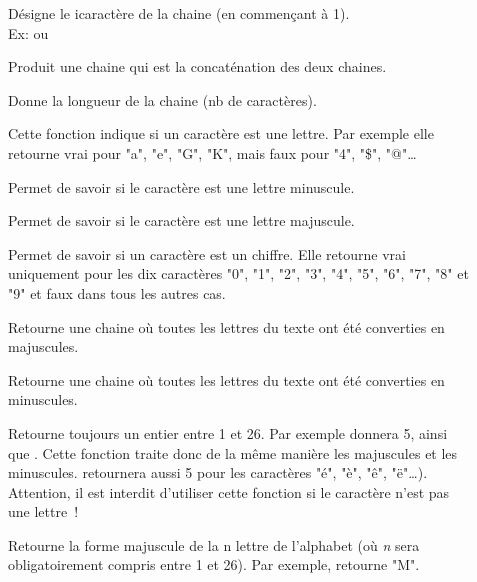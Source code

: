 	\begin{description}
		\item[]
		Désigne le i\ieme caractère de la chaine (en commençant à 1).
		\\Ex: 
		ou 
		\item[]
		Produit une chaine qui est la concaténation des deux chaines.
		\item[]
		Donne la longueur de la chaine (nb de caractères).
		\item[]
		Cette fonction indique si un caractère est une lettre. 
		Par exemple elle retourne vrai pour "a", "e", "G", "K", 
		mais faux pour "4", "\$", "@"\dots %
		\item[]	
		Permet de savoir si le caractère est une lettre minuscule.
		\item[]	
		Permet de savoir si le caractère est une lettre majuscule.
		\item[]	
		Permet de savoir si un caractère est un chiffre. 
		Elle retourne vrai uniquement pour les dix caractères 
		"0", "1", "2", "3", "4", "5", "6", "7", "8" et "9" 
		et faux dans tous les autres cas.
		\item[]
		Retourne une chaine où toutes les lettres du texte
		ont été converties en majuscules.
		\item[]
		Retourne une chaine où toutes les lettres du texte
		ont été converties en minuscules.
		\item[]
		Retourne toujours un entier entre 1 et 26. 
		Par exemple  donnera 5, 
		ainsi que . 
		Cette fonction traite donc de la même manière 
		les majuscules et les minuscules. 
		 retournera aussi 5 pour les caractères "é", "è", "ê", "ë"\dots). 
		Attention, il est interdit d’utiliser cette fonction 
		si le caractère n’est pas une lettre~!
		\item[]
		Retourne la forme majuscule de la n\ieme{} lettre de l’alphabet 
		(où \textit{n} sera obligatoirement compris entre 1 et 26). 
		Par exemple,  retourne "M".
		\item[]

\end{description}
